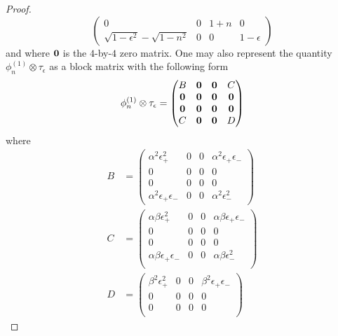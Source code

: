 \documentclass[11pt]{article}
\theoremstyle{definition}
\begin{document}
\begin{proof}
\begin{equation}
\begin{pmatrix}
            0 & 0 & 1+n & 0 \\
            \sqrt{1-\epsilon^2} - \sqrt{1-n^2} & 0 & 0 & 1 - \epsilon
        \end{pmatrix}
    \end{equation}
    and where $\bf{0}$ is the $4$-by-$4$ zero matrix. One may also represent
    the quantity $\phi_n^{(1)} \otimes \tau_{\epsilon}$ as a block matrix with
    the following form
    \begin{equation}
        \phi_n^{(1)} \otimes \tau_{\epsilon} = 
        \begin{pmatrix}
            B & \bf{0} & \bf{0} & C \\
            \bf{0} & \bf{0} & \bf{0} & \bf{0} \\
            \bf{0} & \bf{0} & \bf{0} & \bf{0} \\
            C & \bf{0} & \bf{0} & D
        \end{pmatrix}
    \end{equation}
    where 
    \begin{equation}
        \begin{aligned}
            B &= 
            \begin{pmatrix}
                \alpha^2 \epsilon_+^2 & 0 & 0 & \alpha^2 \epsilon_+ \epsilon_- \\
                0 & 0 & 0 & 0 \\
                0 & 0 & 0 & 0 \\
                \alpha^2 \epsilon_+ \epsilon_- & 0 & 0 & \alpha^2 \epsilon_-^2
            \end{pmatrix} \\
            C &=
            \begin{pmatrix}
                \alpha \beta \epsilon_+^2 & 0 & 0 & \alpha \beta \epsilon_+ \epsilon_- \\
                0 & 0 & 0 & 0 \\
                0 & 0 & 0 & 0 \\
                \alpha \beta \epsilon_+ \epsilon_- & 0 & 0 & \alpha \beta \epsilon_-^2 \\
            \end{pmatrix} \\
            D &= 
            \begin{pmatrix}
                \beta^2 \epsilon_+^2 & 0 & 0 & \beta^2 \epsilon_+ \epsilon_- \\
                0 & 0 & 0 & 0 \\
                0 & 0 & 0 & 0 \\

\end{pmatrix}
\end{aligned}
\end{equation}
\end{proof}
\end{document}
